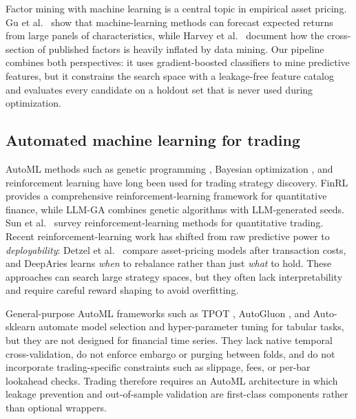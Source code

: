 \documentclass[analytics,article,submit,pdftex,moreauthors]{Definitions/mdpi}
\begin{document}
Factor mining with machine learning is a central topic in empirical asset pricing. Gu et al.~\citep{gu_2020} show that machine-learning methods can forecast expected returns from large panels of characteristics, while Harvey et al.~\citep{harvey_2016} document how the cross-section of published factors is heavily inflated by data mining. Our pipeline combines both perspectives: it uses gradient-boosted classifiers to mine predictive features, but it constrains the search space with a leakage-free feature catalog and evaluates every candidate on a holdout set that is never used during optimization.

\subsection{Automated machine learning for trading}\label{automated-machine-learning-for-trading}

AutoML methods such as genetic programming \citep{allen_1999, brabazon_kampouridis_oneill_2020}, Bayesian optimization \citep{akiba_2019}, and reinforcement learning \citep{sutton_2018} have long been used for trading strategy discovery. FinRL \citep{liu_2021} provides a comprehensive reinforcement-learning framework for quantitative finance, while LLM-GA \citep{zhang_2025} combines genetic algorithms with LLM-generated seeds. Sun et al.~\citep{sun_2023_rl_survey} survey reinforcement-learning methods for quantitative trading. Recent reinforcement-learning work has shifted from raw predictive power to \emph{deployability}: Detzel et al.~\citep{detzel_novy_marx_velikov_2023} compare asset-pricing models after transaction costs, and DeepAries \citep{deeparies_2025} learns \emph{when} to rebalance rather than just \emph{what} to hold. These approaches can search large strategy spaces, but they often lack interpretability and require careful reward shaping to avoid overfitting.

General-purpose AutoML frameworks such as TPOT \citep{olson_moore_2016_tpot}, AutoGluon \citep{erickson_2020_autogluon}, and Auto-sklearn \citep{feurer_2015_autosklearn} automate model selection and hyper-parameter tuning for tabular tasks, but they are not designed for financial time series. They lack native temporal cross-validation, do not enforce embargo or purging between folds, and do not incorporate trading-specific constraints such as slippage, fees, or per-bar lookahead checks. Trading therefore requires an AutoML architecture in which leakage prevention and out-of-sample validation are first-class components rather than optional wrappers.
\end{document}

